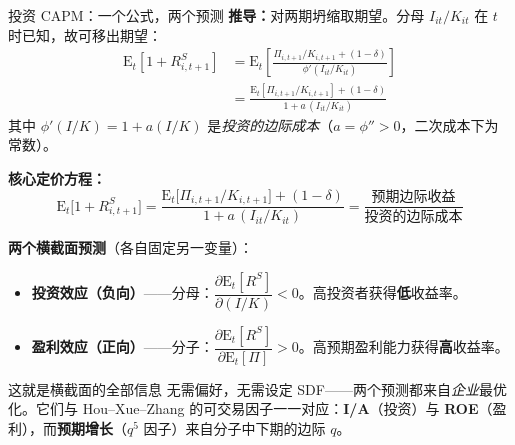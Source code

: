 \documentclass{beamer}
\begin{document}
\begin{frame}{投资 CAPM：一个公式，两个预测}
	\textbf{推导：}对两期坍缩取期望。分母 $I_{it}/K_{it}$ 在 $t$ 时已知，故可移出期望：
	\begin{align*}
		\mathrm{E}_t\left[1 + R^S_{i,t+1}\right] &= \mathrm{E}_t\left[\frac{\Pi_{i,t+1}/K_{i,t+1}+(1-\delta)}{\phi'(I_{it}/K_{it})}\right] \\
		&= \frac{\mathrm{E}_t[\Pi_{i,t+1}/K_{i,t+1}]+(1-\delta)}{1 + a\,(I_{it}/K_{it})}
	\end{align*}
	其中 $\phi'(I/K)=1 + a(I/K)$ 是\textit{投资的边际成本}（$a=\phi''>0$，二次成本下为常数）。

	\vspace{0.15cm}
	\textbf{核心定价方程：}
	\begin{equation}\label{equ:investment capm}
		\boxed{\;\mathrm{E}_t\big[1+R^S_{i,t+1}\big]=\frac{\mathrm{E}_t\big[\Pi_{i,t+1}/K_{i,t+1}\big]+(1-\delta)}{1+a\,(I_{it}/K_{it})}=\frac{\text{预期边际收益}}{\text{投资的边际成本}}\;}
	\end{equation}

	\textbf{两个横截面预测}（各自固定另一变量）：
	\begin{itemize}
		\item \textbf{投资效应（负向）}——分母：$\dfrac{\partial \mathrm{E}_t[R^S]}{\partial (I/K)}<0$。高投资者获得\textbf{低}收益率。
		\item \textbf{盈利效应（正向）}——分子：$\dfrac{\partial \mathrm{E}_t[R^S]}{\partial \mathrm{E}_t[\Pi]}>0$。高预期盈利能力获得\textbf{高}收益率。
	\end{itemize}
	\begin{block}{这就是横截面的全部信息}
		无需偏好，无需设定 SDF——两个预测都来自\textit{企业}最优化。它们与 Hou--Xue--Zhang 的可交易因子一一对应：\textbf{I/A}（投资）与 \textbf{ROE}（盈利），而\textbf{预期增长}（$q^5$ 因子）来自分子中下期的边际 $q$。
	\end{block}
\end{frame}
\end{document}
